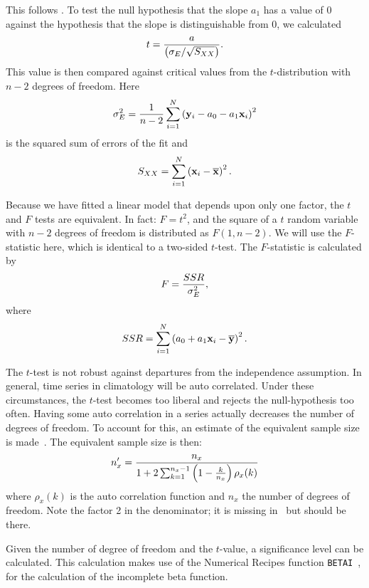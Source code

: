 \documentclass[a4paper,11pt]{article}
\begin{document}
This follows \cite[\S8.3.8]{vonstorch}. To test the null hypothesis that the slope $a_1$ has a value of 0 against
the hypothesis that the slope is distinguishable from 0, we calculated
\begin{equation*} 
t = {a \over \left( \sigma_E / \sqrt{S_{XX}} \right)}.
\end{equation*}
This value is then compared against critical values from the $t$-distribution with $n - 2$ degrees of freedom.
Here
\begin{equation*}
\sigma^2_E = {1 \over n - 2} \sum_{i=1}^N \left( {\bf y}_i - a_0 - a_1 {\bf x}_i \right)^2
\end{equation*}
is the squared sum of errors of the fit and
\begin{equation*} 
S_{XX} = \sum_{i=1}^N \left( {\bf x}_i - \overline{\bf x} \right)^2.
\end{equation*}

Because we have fitted a linear model that depends upon only one factor, the $t$ and $F$ tests are equivalent. In fact:
$F = t^2$, and the square of a $t$ random variable with $n - 2$ degrees of freedom is distributed as $F(1,n-2)$.
We will use the $F$-statistic here, which is identical to a two-sided $t$-test.
The $F$-statistic is calculated by
\begin{equation*} 
F = {SSR \over \sigma_E^2},
\end{equation*}
where
\begin{equation*}
SSR = \sum_{i=1}^N \left( a_0 + a_1 {\bf x}_i - \overline{\bf y} \right)^2.
\end{equation*}


The $t$-test is not robust against departures from the independence assumption. In general, time series in climatology
will be auto correlated. Under these circumstances, the $t$-test becomes too liberal and rejects the null-hypothesis
too often. Having some auto correlation in a series actually decreases the number of degrees of freedom. To account
for this, an estimate of the equivalent sample size is made~\citep[\S 6.6.8]{vonstorch}. The equivalent sample size
is then:
\begin{equation*} 
n'_x = {n_x \over 1 + 2 \sum_{k=1}^{n_x-1} \left( 1 - {k \over n_x} \right) \rho_x(k) }
\end{equation*}
where $\rho_x(k)$ is the auto correlation function and $n_x$ the number of degrees of freedom. Note the factor 2 in the
denominator; it is missing in~\citet[eq. 6.26]{vonstorch} but should be there.

Given the number of degree of freedom and the $t$-value, a significance level can be calculated. This calculation
makes use of the Numerical Recipes function \texttt{BETAI}~\cite{press:89},
for the calculation of the incomplete beta function.
\end{document}
